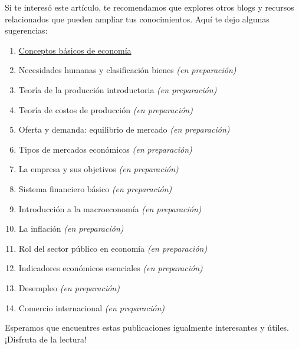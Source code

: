 \documentclass[
  jou,
  floatsintext,
  longtable,
  a4paper,
  nolmodern,
  notxfonts,
  notimes,
  12pt,
  colorlinks=true,linkcolor=blue,citecolor=blue,urlcolor=blue]{apa7}
\providecommand{\tightlist}{%
  \setlength{\itemsep}{0pt}\setlength{\parskip}{0pt}}
\begin{document}
Si te interesó este artículo, te recomendamos que explores otros blogs y
recursos relacionados que pueden ampliar tus conocimientos. Aquí te dejo
algunas sugerencias:

\begin{enumerate}
\def\labelenumi{\arabic{enumi}.}
\tightlist
\item
  \href{https://achalmaedison.netlify.app/cursos/pre_economia/2014-i/sesiones/01-conceptos-basicos-de-economia/index.pdf}{}
  \href{https://achalmaedison.netlify.app/cursos/pre_economia/2014-i/sesiones/01-conceptos-basicos-de-economia}{Conceptos
  básicos de economía}
\item
  Necesidades humanas y clasificación bienes \emph{(en preparación)}
\item
  Teoría de la producción introductoria \emph{(en preparación)}
\item
  Teoría de costos de producción \emph{(en preparación)}
\item
  Oferta y demanda: equilibrio de mercado \emph{(en preparación)}
\item
  Tipos de mercados económicos \emph{(en preparación)}
\item
  La empresa y sus objetivos \emph{(en preparación)}
\item
  Sistema financiero básico \emph{(en preparación)}
\item
  Introducción a la macroeconomía \emph{(en preparación)}
\item
  La inflación \emph{(en preparación)}
\item
  Rol del sector público en economía \emph{(en preparación)}
\item
  Indicadores económicos esenciales \emph{(en preparación)}
\item
  Desempleo \emph{(en preparación)}
\item
  Comercio internacional \emph{(en preparación)}
\end{enumerate}

Esperamos que encuentres estas publicaciones igualmente interesantes y
útiles. ¡Disfruta de la lectura!
\end{document}
